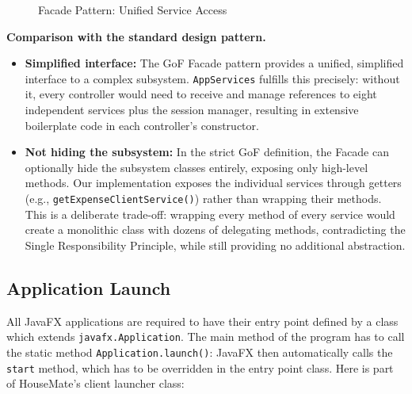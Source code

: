 \begin{figure}[H]
{}%
\caption{Facade Pattern: Unified Service Access}
\end{figure}

\textbf{Comparison with the standard design pattern.}
\begin{itemize}
    \item \textbf{Simplified interface:} The GoF Facade pattern provides a unified, simplified interface to a complex subsystem. \texttt{AppServices} fulfills this precisely: without it, every controller would need to receive and manage references to eight independent services plus the session manager, resulting in extensive boilerplate code in each controller's constructor.
    \item \textbf{Not hiding the subsystem:} In the strict GoF definition, the Facade can optionally hide the subsystem classes entirely, exposing only high-level methods. Our implementation exposes the individual services through getters (e.g., \texttt{getExpenseClientService()}) rather than wrapping their methods. This is a deliberate trade-off: wrapping every method of every service would create a monolithic class with dozens of delegating methods, contradicting the Single Responsibility Principle, while still providing no additional abstraction.
\end{itemize}

\subsection{Application Launch}
All JavaFX applications are required to have their entry point defined by a class which extends \texttt{javafx.Application}. The main method of the program has to call the static method \texttt{Application.launch()}: JavaFX then automatically calls the \texttt{start} method, which has to be overridden in the entry point class. Here is part of HouseMate's client launcher class:

